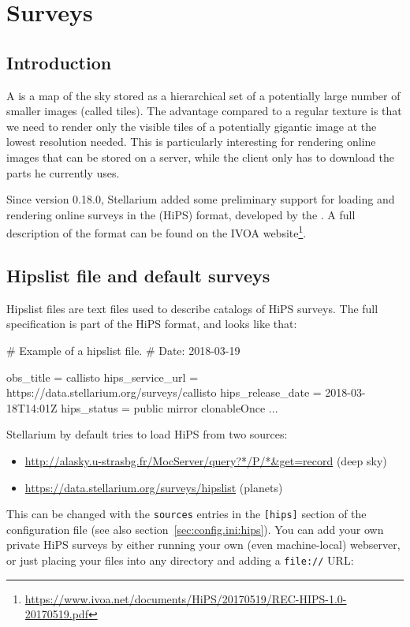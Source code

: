 
\chapter{Surveys}
\label{ch:surveys}

\section{Introduction}
\label{sec:surveys:introduction}
\enlargethispage{\baselineskip}

A   is a map of the sky stored as a hierarchical set of a potentially
large number of smaller images (called tiles).  The advantage compared to a
regular texture is that we need to render only the visible tiles of a potentially gigantic image at the
lowest resolution needed.  This is particularly interesting for rendering
online images that can be stored on a server, while the client only has
to download the parts he currently uses.

Since version 0.18.0, Stellarium added some preliminary support for loading and
rendering online surveys in the  (HiPS) format,
developed by the .
A full description of the format can be found on the IVOA website\footnote{%
\url{https://www.ivoa.net/documents/HiPS/20170519/REC-HIPS-1.0-20170519.pdf}}.

\section{Hipslist file and default surveys}
\label{sec:surveys:hipslistFile}

Hipslist files are text files used to describe catalogs of HiPS surveys.  The
full specification is part of the HiPS format, and looks like that:

\begin{configfileScr}
# Example of a hipslist file.
# Date: 2018-03-19

obs_title         = callisto
hips_service_url  = https://data.stellarium.org/surveys/callisto
hips_release_date = 2018-03-18T14:01Z
hips_status       = public mirror clonableOnce
...
\end{configfileScr}

Stellarium by default tries to load HiPS from two sources:
\begin{itemize}
\item\url{http://alasky.u-strasbg.fr/MocServer/query?*/P/*&get=record} (deep sky)
\item\url{https://data.stellarium.org/surveys/hipslist} (planets)
\end{itemize}
This can be changed with the \texttt{sources} entries in the \texttt{[hips]} section of the configuration
file (see also section~\ref{sec:config.ini:hips}).  You can add your
own private HiPS surveys by either running your own (even machine-local) webserver, 
or just placing your files into any directory and adding a \texttt{file://} URL:

